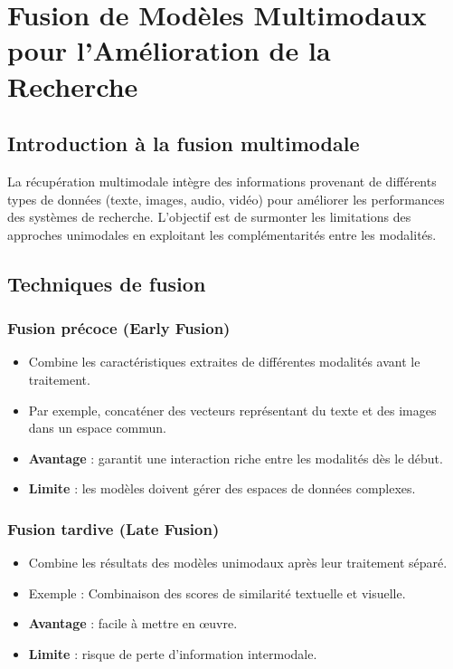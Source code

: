 \begin{section}

  \chapter{Fusion de Modèles Multimodaux pour l’Amélioration de la Recherche}



\section{Introduction à la fusion multimodale}
La récupération multimodale intègre des informations provenant de différents types de données (texte, images, audio, vidéo) pour améliorer les performances des systèmes de recherche. L’objectif est de surmonter les limitations des approches unimodales en exploitant les complémentarités entre les modalités.
\setcounter{section}{1}
\section{Techniques de fusion}
\subsection{Fusion précoce (Early Fusion)}
\begin{itemize}
    \item Combine les caractéristiques extraites de différentes modalités avant le traitement.
    \item Par exemple, concaténer des vecteurs représentant du texte et des images dans un espace commun.
    \item \textbf{Avantage} : garantit une interaction riche entre les modalités dès le début.
    \item \textbf{Limite} : les modèles doivent gérer des espaces de données complexes.
\end{itemize}

\subsection{Fusion tardive (Late Fusion)}
\begin{itemize}
    \item Combine les résultats des modèles unimodaux après leur traitement séparé.
    \item Exemple : Combinaison des scores de similarité textuelle et visuelle.
    \item \textbf{Avantage} : facile à mettre en œuvre.
    \item \textbf{Limite} : risque de perte d'information intermodale.
\end{itemize}


\end{section}
